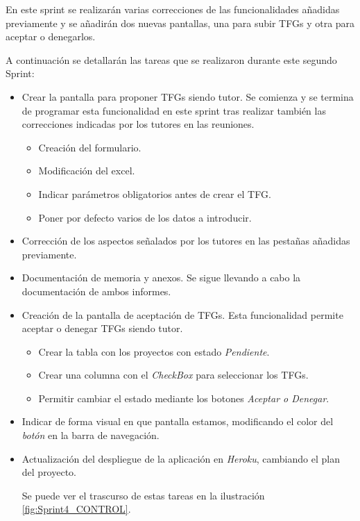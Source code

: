 En este sprint se realizarán varias correcciones de las funcionalidades añadidas previamente y se añadirán dos nuevas pantallas, una para subir TFGs y otra para aceptar o denegarlos.

A continuación se detallarán las tareas que se realizaron durante este segundo Sprint:

\begin{itemize}
	\item Crear la pantalla para proponer TFGs siendo tutor. Se comienza y se termina de programar esta funcionalidad en este sprint tras realizar también las correcciones indicadas por los tutores en las reuniones.
	\begin{itemize}
		\item Creación del formulario.
		\item Modificación del excel.
		\item Indicar parámetros obligatorios antes de crear el TFG.
		\item Poner por defecto varios de los datos a introducir.
	\end{itemize}
	\item Corrección de los aspectos señalados por los tutores en las pestañas añadidas previamente.
	\item Documentación de memoria y anexos. Se sigue llevando a cabo la documentación de ambos informes.
	\item Creación de la pantalla de aceptación de TFGs. Esta funcionalidad permite aceptar o denegar TFGs siendo tutor.
	\begin{itemize}
		\item Crear la tabla con los proyectos con estado \emph{Pendiente}.
		\item Crear una columna con el \emph{CheckBox} para seleccionar los TFGs.
		\item Permitir cambiar el estado mediante los botones \emph{Aceptar o Denegar}.
	\end{itemize}
	\item Indicar de forma visual en que pantalla estamos, modificando el color del \emph{botón} en la barra de navegación.
	\item Actualización del despliegue de la aplicación en \emph{Heroku}, cambiando el plan del proyecto.

	Se puede ver el trascurso de estas tareas en la ilustración \ref{fig:Sprint4_CONTROL}.

\end{itemize} 

